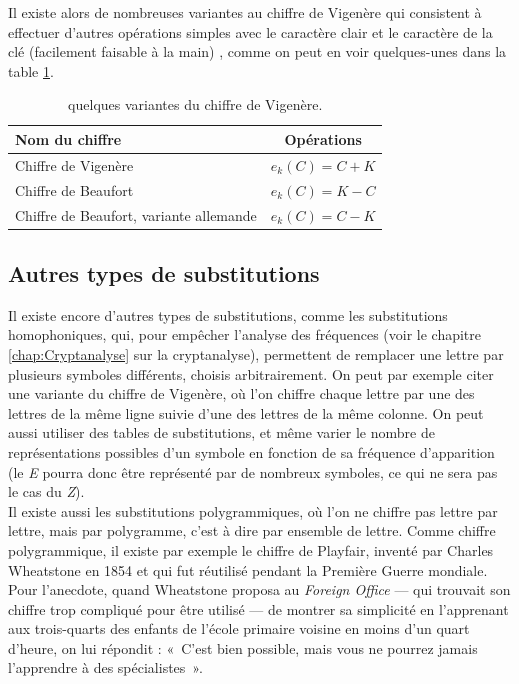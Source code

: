 Il existe alors de nombreuses variantes au chiffre de Vigenère qui
consistent à effectuer d'autres opérations simples avec le caractère
clair et le caractère de la clé (facilement faisable à la main) ,
comme on peut en voir quelques-unes dans la table \ref{tab:VariantesVigenere}. 
\begin{table}[h]
  \caption{quelques variantes du chiffre de Vigenère.}
  \label{tab:VariantesVigenere}
  \begin{center}
    \begin{tabular}{|l|c|}
      \hline
      \textbf{Nom du chiffre} & \textbf{Opérations} \\
      \hline
      Chiffre de Vigenère & $e_k(C) = C + K$ \\ 
      \hline
      Chiffre de Beaufort & $e_k(C) = K - C$ \\
      \hline
      Chiffre de Beaufort, variante allemande & $e_k(C) = C - K$ \\
      \hline
    \end{tabular}
  \end{center}
\end{table}

\subsection{Autres types de substitutions\label{sec:SubstitutionsPolygrammiques}}
Il existe encore d'autres types de substitutions, comme les
substitutions homophoniques, qui, pour empêcher l'analyse des
fréquences (voir le chapitre \ref{chap:Cryptanalyse} sur la
cryptanalyse), permettent de remplacer une lettre par plusieurs
symboles différents, choisis arbitrairement. On peut par exemple citer
une variante du chiffre de Vigenère, où l'on chiffre chaque lettre par
une des lettres de la même ligne suivie d'une des lettres de la même
colonne. On peut aussi utiliser des tables de substitutions, et même
varier le nombre de représentations possibles d'un symbole en fonction
de sa fréquence d'apparition (le \emph{E} pourra donc être représenté par
de nombreux symboles, ce qui ne sera pas le cas du \emph{Z}).\\

Il existe aussi les substitutions polygrammiques, où l'on ne chiffre
pas lettre par lettre, mais par polygramme, c'est à dire par ensemble
de lettre. Comme chiffre polygrammique, il existe par exemple le
chiffre de Playfair, inventé par Charles Wheatstone en 1854 et qui fut
réutilisé pendant la Première Guerre mondiale. Pour l'anecdote,
quand Wheatstone proposa au \emph{Foreign Office} --- qui trouvait son chiffre
trop compliqué pour être utilisé --- de montrer sa simplicité en
l'apprenant aux trois-quarts des enfants de l'école primaire voisine
en moins d'un quart d'heure, on lui répondit : «~C'est bien possible,
mais vous ne pourrez jamais l'apprendre à des spécialistes~».


